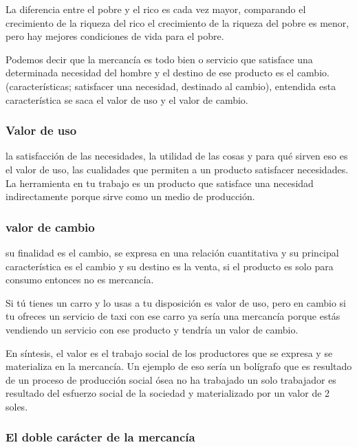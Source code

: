 \documentclass[
  a4paper,
]{article}
\begin{document}
La diferencia entre el pobre y el rico es cada vez mayor, comparando el
crecimiento de la riqueza del rico el crecimiento de la riqueza del
pobre es menor, pero hay mejores condiciones de vida para el pobre.

Podemos decir que la mercancía es todo bien o servicio que satisface una
determinada necesidad del hombre y el destino de ese producto es el
cambio. (características; satisfacer una necesidad, destinado al
cambio), entendida esta característica se saca el valor de uso y el
valor de cambio.

\hypertarget{valor-de-uso}{%
\subsubsection{Valor de uso}\label{valor-de-uso}}

la satisfacción de las necesidades, la utilidad de las cosas y para qué
sirven eso es el valor de uso, las cualidades que permiten a un producto
satisfacer necesidades. La herramienta en tu trabajo es un producto que
satisface una necesidad indirectamente porque sirve como un medio de
producción.

\hypertarget{valor-de-cambio}{%
\subsubsection{valor de cambio}\label{valor-de-cambio}}

su finalidad es el cambio, se expresa en una relación cuantitativa y su
principal característica es el cambio y su destino es la venta, si el
producto es solo para consumo entonces no es mercancía.

Si tú tienes un carro y lo usas a tu disposición es valor de uso, pero
en cambio si tu ofreces un servicio de taxi con ese carro ya sería una
mercancía porque estás vendiendo un servicio con ese producto y tendría
un valor de cambio.

En síntesis, el valor es el trabajo social de los productores que se
expresa y se materializa en la mercancía. Un ejemplo de eso sería un
bolígrafo que es resultado de un proceso de producción social ósea no ha
trabajado un solo trabajador es resultado del esfuerzo social de la
sociedad y materializado por un valor de 2 soles.

\hypertarget{el-doble-caruxe1cter-de-la-mercancuxeda}{%
\subsubsection{El doble carácter de la
mercancía}\label{el-doble-caruxe1cter-de-la-mercancuxeda}}
\end{document}
